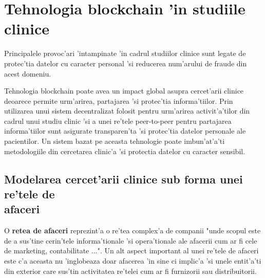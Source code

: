\documentclass[12pt,a4paper,twoside]{report}
\begin{document}
\section{Tehnologia blockchain 'in studiile clinice}
Principalele provoc'ari 'intampinate 'in cadrul studiilor clinice sunt legate de protec'tia datelor cu caracter personal 'si reducerea num'arului de fraude din acest domeniu.

Tehnologia blockchain poate avea un impact global asupra cercet'arii clinice deoarece permite urm'arirea, partajarea 'si protec'tia informa'tiilor. Prin utilizarea unui sistem decentralizat folosit pentru urm'arirea activit'a'tilor din cadrul unui studiu clinic 'si a unei re'tele peer-to-peer pentru partajarea informa'tiilor sunt asigurate transparen'ta 'si protec'tia datelor personale ale pacientilor. Un sistem bazat pe aceasta tehnologie poate imbun'at'a'ti metodologiile din cercetarea clinic'a 'si protectia datelor cu caracter sensibil.

\subsection{Modelarea cercet'arii clinice sub forma unei re'tele de\\ afaceri}

	O \textbf{retea de afaceri} reprezint'a o re'tea complex'a de companii "unde scopul este de a sus'tine cerin'tele informa'tionale 'si opera'tionale ale afacerii cum ar fi cele de marketing, contabilitate ..."\cite{bndef}. Un alt aspect important al unei re'tele de afaceri este c'a aceasta nu 'inglobeaza doar afacerea 'in sine ci implic'a 'si unele entit'a'ti din exterior care sus'tin activitatea re'telei cum ar fi furnizorii sau distribuitorii. 
	
\end{document}
